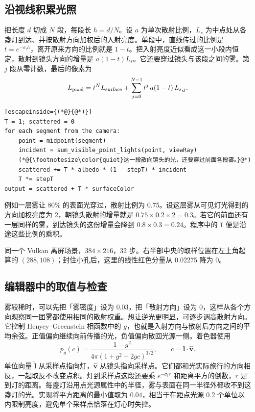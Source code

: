 \clearpage
\subsection*{沿视线积累光照}
把长度 $d$ 切成 $N$ 段，每段长 $h=d/N$。设 $a$ 为单次散射比例，$L_s$ 为中点处从各盏灯到达、并按散射方向加权后的入射亮度。单段中，直线传过的比例是 $t=e^{-\sigma_t h}$，离开原来方向的比例就是 $1-t$。把入射亮度近似看成这一小段内恒定，散射到镜头方向的增量是 $a(1-t)L_s$。它还要穿过镜头与该段之间的雾。第 $j$ 段从零计数，最后的像素为
\[
 L_{\rm pixel}=t^N L_{\rm surface}
   +\sum_{j=0}^{N-1}t^j\, a(1-t)\,L_{s,j}.
\]
\par\nopagebreak
\begin{lstlisting}[escapeinside={(*@}{@*)}]
T = 1; scattered = 0
for each segment from the camera:
    point = midpoint(segment)
    incident = sum_visible_point_lights(point, viewRay)
    (*@{\footnotesize\color{quiet}这一段散向镜头的光，还要穿过前面各段雾。}@*)
    scattered += T * albedo * (1 - stepT) * incident
    T *= stepT
output = scattered + T * surfaceColor
\end{lstlisting}

例如一层雾让 80\% 的表面光穿过，散射比例为 0.75。设这层雾从可见灯光得到的方向加权亮度为 2，朝镜头散射的增量就是 $0.75\times0.2\times2=0.3$。若它的前面还有一层同样的雾，到达镜头的这份增量会降到 $0.8\times0.3=0.24$。程序中的 \texttt{T} 便是沿途这些比例的乘积。

{\small\color{quiet}同一个 Vulkan 离屏场景，$384\times216$，32 步。右半部中央的取样位置在左上角起算的 $(288,108)$；封住小孔后，这里的线性红色分量从 0.02275 降为 0。}

\clearpage
\subsection*{编辑器中的取值与检查}
雾较稀时，可以先把「雾密度」设为 0.03，把「散射方向」设为 0，这样从各个方向观察同一团雾都使用相同的散射权重。想让逆光更明显，可逐步调高散射方向。它控制 Henyey--Greenstein 相函数中的 $g$，也就是入射方向与散射后方向之间的平均余弦。正值偏向继续向前传播的光，负值偏向散回光源一侧。着色器使用
\[
p_g(c)=\frac{1-g^2}{4\pi(1+g^2-2gc)^{3/2}},
\qquad c=\hat{\boldsymbol l}\cdot\hat{\boldsymbol v}.
\]
单位向量 $\hat{\boldsymbol l}$ 从采样点指向灯，$\hat{\boldsymbol v}$ 从镜头指向采样点。它们都和光实际旅行的方向相反，一起取反不改变点积。灯到采样点这段还要乘 $e^{-\sigma_t r}$ 和距离平方的倒数，$r$ 是到灯的距离。每盏灯沿用点光源属性中的半径，雾与表面在同一半径外都收不到这盏灯的光。实现将平方距离的最小值取为 $0.04$，相当于在距点光源 0.2 个单位以内限制亮度，避免单个采样点恰落在灯心时失控。

